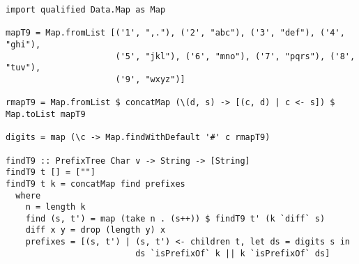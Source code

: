 \documentclass{article}
\begin{document}
\lstset{language=Haskell}
\begin{lstlisting}[caption=T9 look up]
import qualified Data.Map as Map

mapT9 = Map.fromList [('1', ",."), ('2', "abc"), ('3', "def"), ('4', "ghi"),
                      ('5', "jkl"), ('6', "mno"), ('7', "pqrs"), ('8', "tuv"),
                      ('9', "wxyz")]

rmapT9 = Map.fromList $ concatMap (\(d, s) -> [(c, d) | c <- s]) $ Map.toList mapT9

digits = map (\c -> Map.findWithDefault '#' c rmapT9)

findT9 :: PrefixTree Char v -> String -> [String]
findT9 t [] = [""]
findT9 t k = concatMap find prefixes
  where
    n = length k
    find (s, t') = map (take n . (s++)) $ findT9 t' (k `diff` s)
    diff x y = drop (length y) x
    prefixes = [(s, t') | (s, t') <- children t, let ds = digits s in
                          ds `isPrefixOf` k || k `isPrefixOf` ds]
\end{lstlisting}

\ifx\wholebook\relax \else
\end{document}
